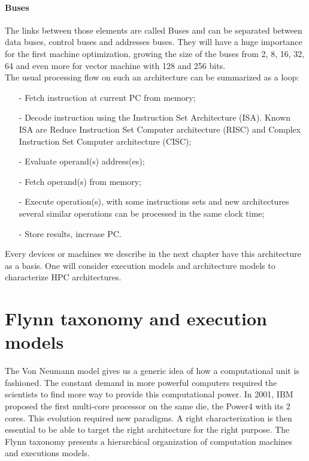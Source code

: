 \paragraph{Buses}
The links between those elements are called Buses and can be separated between data buses, control buses and addresses buses.
They will have a huge importance for the first machine optimization, growing the size of the buses from 2, 8, 16, 32, 64 and even more for vector machine with 128 and 256 bits.\\

The usual processing flow on such an architecture can be summarized as a loop: 
\begin{itemize}[noitemsep,nolistsep]
\item[-] Fetch instruction at current PC from memory;
\item[-] Decode instruction using the Instruction Set Architecture (ISA). Known ISA are Reduce Instruction Set Computer architecture (RISC) and Complex Instruction Set Computer architecture (CISC);
\item[-] Evaluate operand(s) address(es);
\item[-] Fetch operand(s) from memory;
\item[-] Execute operation(s), with some instructions sets and new architectures several similar operations can be processed in the same clock time;
\item[-] Store results, increase PC.\\
\end{itemize}

Every devices or machines we describe in the next chapter have this architecture as a basis. 
One will consider execution models and architecture models to characterize HPC architectures.

\section{Flynn taxonomy and execution models}
The Von Neumann model gives us a generic idea of how a computational unit is fashioned. 
The constant demand in more powerful computers required the scientists to find more way to provide this computational power.
In 2001, IBM proposed the first multi-core processor on the same die, the Power4 with its 2 cores.
This evolution required new paradigms.
A right characterization is then essential to be able to target the right architecture for the right purpose. 
The Flynn taxonomy presents a hierarchical organization of computation machines and executions models.

